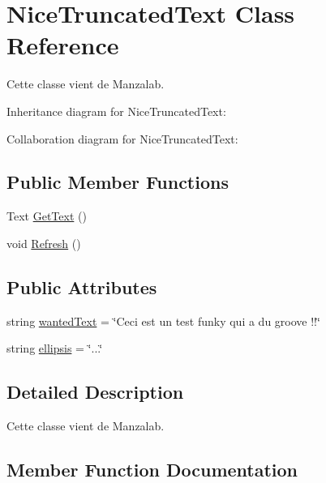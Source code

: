 \hypertarget{class_nice_truncated_text}{}\section{Nice\+Truncated\+Text Class Reference}
\label{class_nice_truncated_text}


Cette classe vient de Manzalab.  




Inheritance diagram for Nice\+Truncated\+Text\+:


Collaboration diagram for Nice\+Truncated\+Text\+:
\subsection*{Public Member Functions}
\begin{DoxyCompactItemize}
\item 
Text \hyperlink{class_nice_truncated_text_ac19b817dfd271d1928a32b72f5a84605}{Get\+Text} ()
\item 
void \hyperlink{class_nice_truncated_text_ab8e633b48e6f2272b10219e0b4709b71}{Refresh} ()
\end{DoxyCompactItemize}
\subsection*{Public Attributes}
\begin{DoxyCompactItemize}
\item 
string \hyperlink{class_nice_truncated_text_a2c5d5911671fcda5f98e8aff3ba09dc3}{wanted\+Text} = \char`\"{}Ceci est un test funky qui a du groove !!\char`\"{}
\item 
string \hyperlink{class_nice_truncated_text_a5ef5240eb588ff3b754350f8f54b876a}{ellipsis} = \char`\"{}...\char`\"{}
\end{DoxyCompactItemize}


\subsection{Detailed Description}
Cette classe vient de Manzalab. 



\subsection{Member Function Documentation}
\mbox{\label{class_nice_truncated_text_ac19b817dfd271d1928a32b72f5a84605}} 
